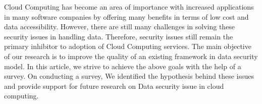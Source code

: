 Cloud Computing has become an area of importance with increased applications in many software companies by offering many benefits in terms of low cost and data accessibility. However, there are still many challenges in solving these security issues in handling data. Therefore, security issues still remain the primary inhibitor to adoption of Cloud Computing services.  The main objective of our research is to  improve  the quality of an existing framework in data security model. In this article, we strive to achieve the above goals with the help of a survey.
On conducting a survey, We identified the hypothesis behind these issues and provide support for future research on Data security issue in cloud computing.